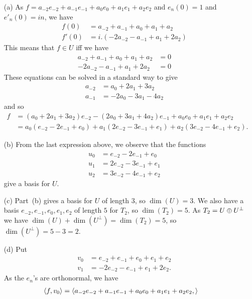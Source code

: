 \begin{itemize}
  \item[(a)] As $f=a_{-2}e_{-2}+a_{-1}e_{-1}+a_0e_0+a_1e_1+a_2e_2$ and
   $e_n(0)=1$ and $e'_n(0)=in$, we have
   \begin{align*}
    f(0)  &= a_{-2} + a_{-1} + a_0 + a_1 + a_2 \\
    f'(0) &= i.(-2a_{-2} - a_{-1} + a_1 + 2a_2)
   \end{align*}
   This means that $f\in U$ iff we have
   \begin{align*}
    a_{-2} + a_{-1} + a_0 + a_1 + a_2  &= 0 \\
    -2a_{-2} - a_{-1} + a_1 + 2a_2 &= 0
   \end{align*}
   These equations can be solved in a standard way to give
   \begin{align*}
    a_{-2} &= a_0 + 2a_1 + 3 a_2 \\
    a_{-1} &= - 2a_0 - 3a_1 - 4a_2
   \end{align*}
   and so
   \begin{align*}
    f &= (a_0+2a_1+3a_2) e_{-2} - (2a_0+3a_1+4a_2) e_{-1} +
          a_0e_0 + a_1e_1 + a_2e_2 \\
      &= a_0(e_{-2}-2e_{-1}+e_0) + a_1(2e_{-2}-3e_{-1}+e_1) +
         a_2(3e_{-2}-4e_{-1}+e_2).
   \end{align*}
  \item[(b)] From the last expression above, we observe that the
   functions
   \begin{align*}
    u_0 &= e_{-2}-2e_{-1}+e_0 \\
    u_1 &= 2e_{-2}-3e_{-1}+e_1 \\
    u_2 &= 3e_{-2}-4e_{-1}+e_2
   \end{align*}
   give a basis for $U$.
  \item[(c)] Part~(b) gives a basis for $U$ of length $3$, so
   $\dim(U)=3$.  We also have a basis $e_{-2},e_{-1},e_0,e_1,e_2$ of
   length $5$ for $T_2$, so $\dim(T_2)=5$.  As $T_2=U\oplus U^\perp$ we have
   $\dim(U)+\dim(U^\perp)=\dim(T_2)=5$, so $\dim(U^\perp)=5-3=2$.
  \item[(d)] Put
   \begin{align*}
    v_0 &= e_{-2} + e_{-1} + e_0 + e_1 + e_2 \\
    v_1 &= -2e_{-2} -e_{-1} + e_1 + 2e_2.
   \end{align*}
   As the $e_n$'s are orthonormal, we have
   \begin{align*}
    \langle f,v_0\rangle &= \langle a_{-2}e_{-2}+a_{-1}e_{-1}+a_0e_0+a_1e_1+a_2e_2,
\rangle
\end{align*}
\end{itemize}
